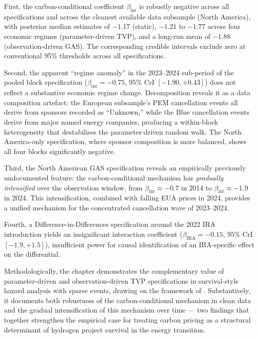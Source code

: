 \documentclass[11pt,a4paper]{article}
\newcommand{\bint}{\beta_{\mathrm{int}}}
\begin{document}
First, the carbon-conditional coefficient $\bint$ is robustly negative across all specifications and across the cleanest available data subsample (North America), with posterior median estimates of $-1.17$ (static), $-1.21$ to $-1.77$ across four economic regimes (parameter-driven TVP), and a long-run mean of $-1.88$ (observation-driven GAS). The corresponding credible intervals exclude zero at conventional 95\% thresholds across all specifications.

Second, the apparent ``regime anomaly'' in the 2023--2024 sub-period of the pooled block specification ($\bint = -0.75$, 95\% CrI $[-1.90, +0.43]$) does not reflect a substantive economic regime change. Decomposition reveals it as a data composition artefact: the European subsample's PEM cancellation events all derive from sponsors recorded as ``Unknown,'' while the Blue cancellation events derive from major named energy companies, producing a within-block heterogeneity that destabilises the parameter-driven random walk. The North America-only specification, where sponsor composition is more balanced, shows all four blocks significantly negative.

Third, the North American GAS specification reveals an empirically previously undocumented feature: the carbon-conditional mechanism has \textit{gradually intensified} over the observation window, from $\bint \approx -0.7$ in 2014 to $\bint \approx -1.9$ in 2024. This intensification, combined with falling EUA prices in 2024, provides a unified mechanism for the concentrated cancellation wave of 2023--2024.

Fourth, a Difference-in-Differences specification around the 2022 IRA introduction yields an insignificant interaction coefficient ($\beta_{\mathrm{IRA}} = -0.15$, 95\% CrI $[-1.9, +1.5]$), insufficient power for causal identification of an IRA-specific effect on the differential.

Methodologically, the chapter demonstrates the complementary value of parameter-driven and observation-driven TVP specifications in survival-style hazard analysis with sparse events, drawing on the framework of \citet{koopman2016predicting}. Substantively, it documents both robustness of the carbon-conditional mechanism in clean data and the gradual intensification of this mechanism over time --- two findings that together strengthen the empirical case for treating carbon pricing as a structural determinant of hydrogen project survival in the energy transition.
\end{document}
